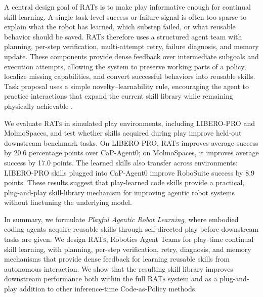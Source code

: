 A central design goal of \textsc{RATs} is to make play informative enough for continual skill learning. A single task-level success or failure signal is often too sparse to explain what the robot has learned, which substep failed, or what reusable behavior should be saved. 
\textsc{RATs} therefore uses a structured agent team with planning, per-step verification, multi-attempt retry, failure diagnosis, and memory update. These components provide dense feedback over intermediate subgoals and execution attempts, allowing the system to preserve working parts of a policy, localize missing capabilities, and convert successful behaviors into reusable skills. Task proposal uses a simple novelty--learnability rule, encouraging the agent to practice interactions that expand the current skill library while remaining physically achievable \citep{oudeyer2007intrinsic, baranes2013active}.

We evaluate \textsc{RATs} in simulated play environments, including LIBERO-PRO and MolmoSpaces, and test whether skills acquired during play improve held-out downstream benchmark tasks. On LIBERO-PRO, \textsc{RATs} improves average success by 20.6 percentage points over CaP-Agent0; on MolmoSpaces, it improves average success by 17.0 points. The learned skills also transfer across environments: LIBERO-PRO skills plugged into CaP-Agent0 improve RoboSuite success by 8.9 points. These results suggest that play-learned code skills provide a practical, plug-and-play skill-library mechanism for improving agentic robot systems without finetuning the underlying model.

In summary, we formulate \emph{Playful Agentic Robot Learning}, where embodied coding agents acquire reusable skills through self-directed play before downstream tasks are given. We design \textsc{RATs}, Robotics Agent Teams for play-time continual skill learning, with planning, per-step verification, retry, diagnosis, and memory mechanisms that provide dense feedback for learning reusable skills from autonomous interaction. We show that the resulting skill library improves downstream performance both within the full \textsc{RATs} system and as a plug-and-play addition to other inference-time Code-as-Policy methods.






